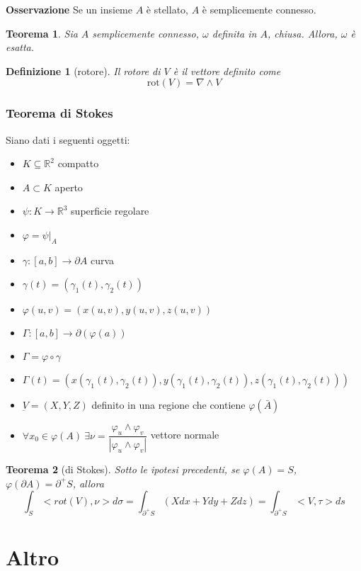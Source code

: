 \documentclass[a4paper,12pt]{article}
\newtheorem{teo}{Teorema}
\newtheorem{defi}{Definizione}
\begin{document}
\textbf{Osservazione}
Se un insieme $A$ è stellato, $A$ è semplicemente connesso.

\begin{teo}
 Sia $A$ semplicemente connesso, $\omega$ definita in $A$, chiusa.
 Allora, $\omega$ è esatta.
\end{teo}

\begin{defi}[rotore]
 Il rotore di $V$ è il vettore definito come
 $$\text{rot}(V) = \nabla\wedge V$$
\end{defi}

\subsubsection{Teorema di Stokes}
Siano dati i seguenti oggetti:
\begin{itemize}
 \item $K\subseteq\mathbb{R}^2$ compatto
 \item $A\subset K$ aperto
 \item $\psi: K\rightarrow\mathbb{R}^3$ superficie regolare
 \item $\varphi = \psi|_A$
 \item $\gamma:[a,b]\rightarrow\partial A$ curva
 \item $\gamma(t) = (\gamma_1(t), \gamma_2(t))$
 \item $\varphi(u,v) = (x(u, v), y(u, v), z(u, v))$
 \item $\Gamma:[a, b]\rightarrow\partial(\varphi(a))$
 \item $\Gamma = \varphi\circ\gamma$
 \item $\Gamma(t)=(x(\gamma_1(t), \gamma_2(t)), y(\gamma_1(t), \gamma_2(t)), z(\gamma_1(t), \gamma_2(t)))$
 \item $\underbar{V} = (X, Y, Z)$ definito in una regione che contiene $\varphi(\bar{A})$
 \item $\forall x_0 \in \varphi(A)\ \exists \nu = \dfrac{\varphi_u\wedge\varphi_v}{|\varphi_u\wedge\varphi_v|}$ vettore normale
\end{itemize}

\begin{teo}[di Stokes]
 Sotto le ipotesi precedenti, se $\varphi(A) = S$, $\varphi(\partial A)=\partial^+S$, allora
 $$\int_S <rot(V), \nu>d\sigma = \int_{\partial^+S}(Xdx+Ydy+Zdz) = \int_{\partial^+S}<V, \tau>ds$$
\end{teo}



\section{Altro}
\end{document}
